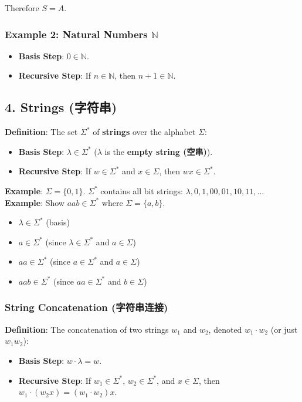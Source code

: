 \documentclass[10pt,a4paper,openany]{ctexbook}
\theoremstyle{definition}
\theoremstyle{remark}
\begin{document}
Therefore $S = A$.
\subsubsection{Example 2: Natural Numbers $\mathbb{N}$}

\begin{itemize}
\item \textbf{Basis Step}: $0 \in \mathbb{N}$.
\item \textbf{Recursive Step}: If $n \in \mathbb{N}$, then $n+1 \in \mathbb{N}$.

\end{itemize}

\vspace{-2pt}

\subsection{4. Strings (字符串)}

\textbf{Definition}: The set $\Sigma^*$ of \textbf{strings} over the alphabet $\Sigma$:
\begin{itemize}
\item \textbf{Basis Step}: $\lambda \in \Sigma^*$ ($\lambda$ is the \textbf{empty string (空串)}).
\item \textbf{Recursive Step}: If $w \in \Sigma^*$ and $x \in \Sigma$, then $wx \in \Sigma^*$.

\end{itemize}

\textbf{Example}: $\Sigma = \{0, 1\}$. $\Sigma^*$ contains all bit strings: $\lambda, 0, 1, 00, 01, 10, 11, \dots$
\textbf{Example}: Show $aab \in \Sigma^*$ where $\Sigma = \{a, b\}$.
\begin{itemize}
\item $\lambda \in \Sigma^*$ (basis)
\item $a \in \Sigma^*$ (since $\lambda \in \Sigma^*$ and $a \in \Sigma$)
\item $aa \in \Sigma^*$ (since $a \in \Sigma^*$ and $a \in \Sigma$)
\item $aab \in \Sigma^*$ (since $aa \in \Sigma^*$ and $b \in \Sigma$)

\end{itemize}

\subsubsection{String Concatenation (字符串连接)}

\textbf{Definition}: The concatenation of two strings $w_1$ and $w_2$, denoted $w_1 \cdot w_2$ (or just $w_1 w_2$):
\begin{itemize}
\item \textbf{Basis Step}: $w \cdot \lambda = w$.
\item \textbf{Recursive Step}: If $w_1 \in \Sigma^*$, $w_2 \in \Sigma^*$, and $x \in \Sigma$, then $w_1 \cdot (w_2 x) = (w_1 \cdot w_2)x$.

\end{itemize}
\end{document}
